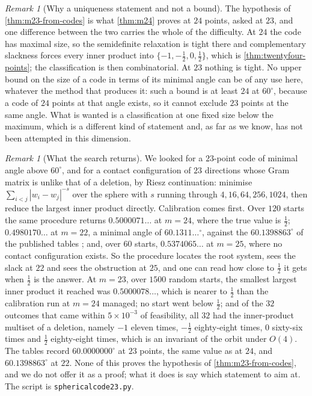 \documentclass[11pt,reqno]{amsart}
\renewcommand{\_}{\origunderscore\allowbreak}
\numberwithin{equation}{section}
\theoremstyle{plain}
\theoremstyle{definition}
\theoremstyle{remark}
\newtheorem{remark}[thm]{Remark}
\begin{document}
\begin{remark}[Why a uniqueness statement and not a bound]\label{rem:m23-uniqueness}
The hypothesis of \cref{thm:m23-from-codes} is what
\cref{thm:m24} proves at $24$ points, asked at $23$, and one
difference between the two carries the whole of the difficulty. At $24$
the code has maximal size, so the semidefinite relaxation is tight
there and complementary slackness forces every inner product into
$\{-1,-\tfrac12,0,\tfrac12\}$, which is \cref{thm:twentyfour-points};
the classification is then combinatorial. At $23$ nothing is tight. No upper
bound on the size of a code in terms of its minimal angle can be of any
use here, whatever the method that produces it: such a bound is at least
$24$ at $60^\circ$, because a code of $24$ points at that angle exists,
so it cannot exclude $23$ points at the same angle. What is wanted is a
classification at one fixed size below the maximum, which is a different
kind of statement and, as far as we know, has not been attempted in this
dimension.
\end{remark}

\begin{remark}[What the search returns]\label{rem:code-search}
We looked for a $23$-point code of minimal angle above $60^\circ$, and
for a contact configuration of $23$ directions whose Gram matrix is
unlike that of a deletion, by Riesz continuation: minimise
$\sum_{i<j}|w_i-w_j|^{-s}$ over the sphere with $s$ running through
$4,16,64,256,1024$, then reduce the largest inner product directly.
Calibration comes first. Over $120$ starts the same procedure returns
$0.5000071\ldots$ at $m=24$, where the true value is $\tfrac12$;
$0.4980170\ldots$ at $m=22$, a minimal angle of $60.1311\ldots^\circ$,
against the $60.1398863^\circ$ of the published tables \cite{Slo}; and,
over $60$ starts, $0.5374065\ldots$ at $m=25$, where no contact
configuration exists. So the procedure locates the root system, sees
the slack at $22$ and sees the obstruction at $25$, and one can read how
close to $\tfrac12$ it gets when $\tfrac12$ is the answer. At $m=23$,
over $1500$ random starts, the smallest largest inner product it reached
was $0.5000078\ldots$, which is nearer to $\tfrac12$ than the calibration
run at $m=24$ managed; no start went below $\tfrac12$; and of the $32$
outcomes that came within $5\times10^{-3}$ of feasibility, all $32$ had
the inner-product multiset of a deletion, namely $-1$ eleven times,
$-\tfrac12$ eighty-eight times, $0$ sixty-six times and $\tfrac12$
eighty-eight times, which is an invariant of the orbit under $O(4)$.
The tables \cite{Slo} record $60.0000000^\circ$ at $23$ points, the same
value as at $24$, and $60.1398863^\circ$ at $22$. None of this proves
the hypothesis of \cref{thm:m23-from-codes}, and we do not offer it as a
proof; what it does is say which statement to aim at. The script is
\texttt{spherical\_code\_23.py}.

\end{remark}
\end{document}
